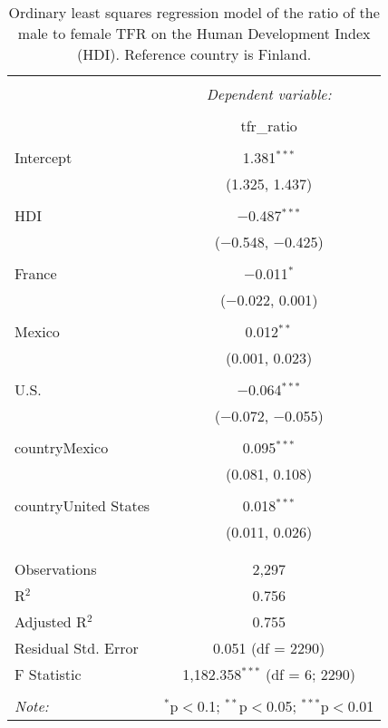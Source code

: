 
\begin{table}[!htbp] \centering 
  \caption{Ordinary least squares regression model of the ratio of the male to female TFR on the Human Development Index (HDI). Reference country is Finland.} 
  \label{mod: quantum} 
\begin{tabular}{@{\extracolsep{5pt}}lc} 
\\[-1.8ex]\hline 
\hline \\[-1.8ex] 
 & \multicolumn{1}{c}{\textit{Dependent variable:}} \\ 
\cline{2-2} 
\\[-1.8ex] & tfr\_ratio \\ 
\hline \\[-1.8ex] 
 Intercept & 1.381$^{***}$ \\ 
  & (1.325, 1.437) \\ 
  & \\ 
 HDI & $-$0.487$^{***}$ \\ 
  & ($-$0.548, $-$0.425) \\ 
  & \\ 
 France & $-$0.011$^{*}$ \\ 
  & ($-$0.022, 0.001) \\ 
  & \\ 
 Mexico & 0.012$^{**}$ \\ 
  & (0.001, 0.023) \\ 
  & \\ 
 U.S. & $-$0.064$^{***}$ \\ 
  & ($-$0.072, $-$0.055) \\ 
  & \\ 
 countryMexico & 0.095$^{***}$ \\ 
  & (0.081, 0.108) \\ 
  & \\ 
 countryUnited States & 0.018$^{***}$ \\ 
  & (0.011, 0.026) \\ 
  & \\ 
\hline \\[-1.8ex] 
Observations & 2,297 \\ 
R$^{2}$ & 0.756 \\ 
Adjusted R$^{2}$ & 0.755 \\ 
Residual Std. Error & 0.051 (df = 2290) \\ 
F Statistic & 1,182.358$^{***}$ (df = 6; 2290) \\ 
\hline 
\hline \\[-1.8ex] 
\textit{Note:}  & \multicolumn{1}{r}{$^{*}$p$<$0.1; $^{**}$p$<$0.05; $^{***}$p$<$0.01} \\ 
\end{tabular} 
\end{table} 
